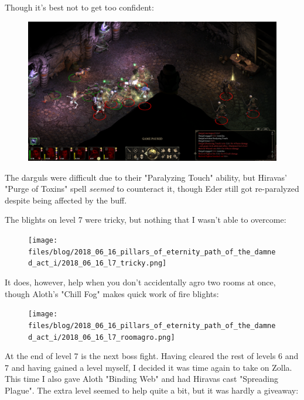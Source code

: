 \documentclass{article}
\begin{document}
Though it's best not to get too confident:

\begin{figure}
\includegraphics[scale=0.33]{files/blog/2018_06_16_pillars_of_eternity_path_of_the_damned_act_i/2018_06_16_l6_darguls.png}
\end{figure}

The darguls were difficult due to their "Paralyzing Touch" ability, but Hiravas' "Purge of Toxins" spell \emph{seemed} to counteract it, though Eder still got re-paralyzed despite being affected by the buff.  

The blights on level 7 were tricky, but nothing that I wasn't able to overcome:

\begin{figure}
\texttt{[image: files/blog/2018\_06\_16\_pillars\_of\_eternity\_path\_of\_the\_damned\_act\_i/2018\_06\_16\_l7\_tricky.png]}
\end{figure}

It does, however, help when you don't accidentally agro two rooms at once, though Aloth's "Chill Fog" makes quick work of fire blights:

\begin{figure}
\texttt{[image: files/blog/2018\_06\_16\_pillars\_of\_eternity\_path\_of\_the\_damned\_act\_i/2018\_06\_16\_l7\_roomagro.png]}
\end{figure}

At the end of level 7 is the next boss fight.  Having cleared the rest of levels 6 and 7 and having gained a level myself, I decided it was time again to take on Zolla.  This time I also gave Aloth "Binding Web" and had Hiravas cast "Spreading Plague".  The extra level seemed to help quite a bit, but it was hardly a giveaway:
\end{document}
